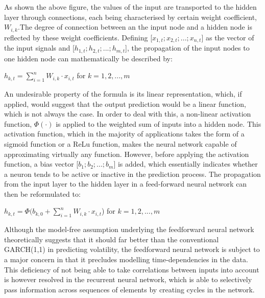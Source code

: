 \documentclass[a4paper,11pt,oneside]{book}
\begin{document}
 As shown the above figure, the values of the input are transported to the hidden layer through connections, each being characterised by certain weight coefficient, $W_{i,k}$.The degree of connection between an the input node and a hidden node is reflected by these weight coefficients. Defining [$x_{1,t};x_{2,t};...;x_{n,t}$] as the vector of the input signals and [$h_{1,t};h_{2,t};...;h_{m,t}$], the propagation of the input nodes to one hidden node can
 mathematically be described by: \newline
 \begin{center}


 $h_{k,t} =\sum_{i=1}^{n} W_{i,k} \cdot x_{i,t}$ for $k = 1,2,...,m$
  \end{center}
An undesirable property of the formula is its linear representation,
which, if applied, would suggest that the output prediction would be a linear function, which is not always the case. In order to deal with this, a non-linear activation function, $\Phi(\cdot)$ is applied to the weighted sum of
inputs into a hidden node. This activation function, which in the majority of
applications takes the form of a sigmoid function or a ReLu function, makes the neural network capable of approximating virtually any function. However, before applying
the activation function, a bias vector [$b_{1};b_{2};...;b_{m}$] is added, which essentially
indicates whether a neuron tends to be active or inactive in the prediction process. The
propagation from the input layer to the hidden layer in a feed-forward neural
network can then be reformulated to:
 \begin{center}
	$h_{k,t} =\Phi(b_{k,0} +\sum_{i=1}^{n} W_{i,k} \cdot x_{i,t}$) for $k = 1,2,...,m$
\end{center}
Although the model-free assumption underlying the feedforward neural network
theoretically suggests that it should far better than the conventional GARCH(1,1) in
predicting volatility, the feedforward neural network is subject to a
major concern in that it precludes modelling time-dependencies in the data. This
deficiency of not being able to take correlations between inputs into account is
however resolved in the recurrent neural network, which is able to selectively pass
information across sequences of elements by creating cycles in the network.
\end{document}
